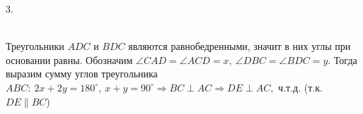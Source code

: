 3. \begin{figure}[ht!]
\end{figure}\\
Треугольники $ADC$ и $BDC$ являются равнобедренными, значит в них углы при основании равны. Обозначим $\angle CAD=\angle ACD=x,\ \angle DBC=\angle BDC=y.$ Тогда выразим сумму углов треугольника $ABC:\ 2x+2y=180^\circ,\ x+y=90^\circ\Rightarrow BC \perp AC\Rightarrow DE\perp AC,$ ч.т.д. (т.к. $DE\parallel BC$)\\
